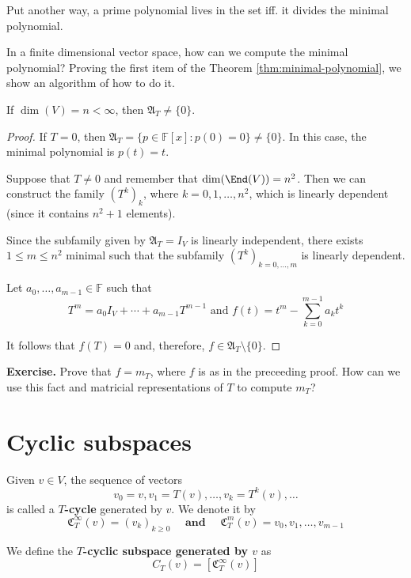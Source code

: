 Put another way, a prime polynomial lives in the set iff. it divides the minimal polynomial.

In a finite dimensional vector space, how can we compute the minimal polynomial? Proving the first item of the Theorem \ref{thm:minimal-polynomial}, we show an algorithm of how to do it.

\begin{theorem}
	If $\dim(V) = n < \infty$, then $\mathfrak{A}_T \neq \{ 0 \}$.
\end{theorem}

\begin{proof}
	If $T = 0$, then $\mathfrak{A}_T = \{ p \in \mathbb{F}[x] : p(0) = 0 \} \neq \{ 0 \}$. In this case, the minimal polynomial is $p(t) = t$.
	
	Suppose that $T \neq 0$ and remember that $\dim(\End(V)) = n^2$. Then we can construct the family $(T^k)_k$, where $k = 0, 1, \ldots, n^2$, which is linearly dependent (since it contains $n^2 + 1$ elements).
	
	Since the subfamily given by $\mathfrak{A}_T = I_V$ is linearly independent, there exists $1 \leq m \leq n^2$ minimal such that the subfamily $(T^k)_{k=0, \ldots, m}$ is linearly dependent.
	
	Let $a_0, \ldots, a_{m-1} \in \mathbb{F}$ such that
	\[
		T^m = a_0 I_V + \cdots + a_{m-1} T^{m-1} \text{ and } f(t) = t^m - \sum_{k=0}^{m-1} a_k t^k
	\]
	
	It follows that $f(T) = 0$ and, therefore, $f \in \mathfrak{A}_T \setminus \{ 0 \}$.
\end{proof}

\textbf{Exercise.} Prove that $f = m_T$, where $f$ is as in the preceeding proof. How can we use this fact and matricial representations of $T$ to compute $m_T$?

\section{Cyclic subspaces}

\begin{definition}[$T$-cycle]
	Given $v \in V$, the sequence of vectors
	\[
		v_0 = v, v_1 = T(v), \ldots, v_k = T^k(v), \ldots
	\]
  is called a \textbf{$T$-cycle} generated by $v$. We denote it by \[ \mathfrak{C}_T^\infty (v) = (v_k)_{k \geq 0} \quad \textbf{ and } \quad \mathfrak{C}_T^m (v) = v_0, v_1, \ldots, v_{m-1} \]

	We define the \textbf{$T$-cyclic subspace generated by $v$} as
	\[
		C_T(v) = [\mathfrak{C}_T^\infty (v)]
	\]
\end{definition}

